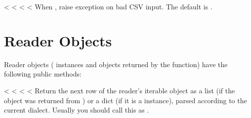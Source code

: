 \documentclass[letterpaper,10pt,english]{sphinxmanual}
\begin{document}

\vspace{5px}

\begin{fulllineitems}
\label{\detokenize{csv:csv.Dialect.strict}}<%
\pysigstartsignatures
<%
<%
<%
When , raise exception {\hyperref[\detokenize{csv:csv.Error}]{}} on bad CSV input.
The default is .

\end{fulllineitems}



\section{Reader Objects}
\label{\detokenize{csv:reader-objects}}
Reader objects ({\hyperref[\detokenize{csv:csv.DictReader}]{}} instances and objects returned by the
{\hyperref[\detokenize{csv:csv.reader}]{}} function) have the following public methods:

\vspace{5px}

\begin{fulllineitems}
\label{\detokenize{csv:csv.csvreader.__next__}}
<%
\pysigstartsignatures
<%
<%
<%
Return the next row of the reader’s iterable object as a list (if the object
was returned from {\hyperref[\detokenize{csv:csv.reader}]{}}) or a dict (if it is a {\hyperref[\detokenize{csv:csv.DictReader}]{}}
instance), parsed according to the current dialect.  Usually you should call
this as .

\end{fulllineitems}
\end{document}
